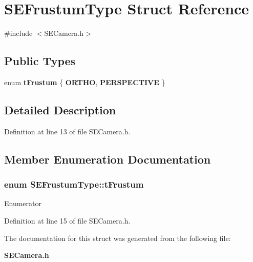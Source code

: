 \section{S\+E\+Frustum\+Type Struct Reference}
\label{struct_s_e_frustum_type}


{\ttfamily \#include $<$S\+E\+Camera.\+h$>$}

\subsection*{Public Types}
\begin{DoxyCompactItemize}
\item 
enum {\bf t\+Frustum} \{ {\bf O\+R\+T\+H\+O}, 
{\bf P\+E\+R\+S\+P\+E\+C\+T\+I\+V\+E}
 \}
\end{DoxyCompactItemize}


\subsection{Detailed Description}


Definition at line 13 of file S\+E\+Camera.\+h.



\subsection{Member Enumeration Documentation}
\subsubsection[{t\+Frustum}]{\setlength{\rightskip}{0pt plus 5cm}enum {\bf S\+E\+Frustum\+Type\+::t\+Frustum}}\label{struct_s_e_frustum_type_a990ede233f2b127b44dd80bf651a958c}
\begin{Desc}
\item[Enumerator]\par
\begin{description}
\item[{\em 
O\+R\+T\+H\+O\label{struct_s_e_frustum_type_a990ede233f2b127b44dd80bf651a958cae8c90da5cee48ec7195171e787189189}
}]\item[{\em 
P\+E\+R\+S\+P\+E\+C\+T\+I\+V\+E\label{struct_s_e_frustum_type_a990ede233f2b127b44dd80bf651a958cae3f3ace861ef652b78b34ab664b440a3}
}]\end{description}
\end{Desc}


Definition at line 15 of file S\+E\+Camera.\+h.



The documentation for this struct was generated from the following file\+:\begin{DoxyCompactItemize}
\item 
{\bf S\+E\+Camera.\+h}\end{DoxyCompactItemize}
